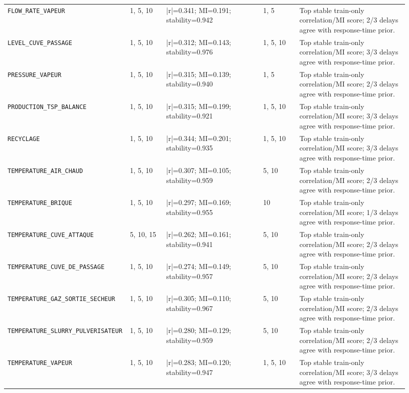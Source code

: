 \documentclass[10pt,a4paper]{article}
\begin{document}
\begin{landscape}
\begin{longtable}{p{0.24\linewidth}p{0.09\linewidth}p{0.24\linewidth}p{0.09\linewidth}p{0.27\linewidth}}
\nolinkurl{FLOW_RATE_VAPEUR} & 1, 5, 10 & |r|=0.341; MI=0.191; stability=0.942 & 1, 5 & Top stable train-only correlation/MI score; 2/3 delays agree with response-time prior. \\
\nolinkurl{LEVEL_CUVE_PASSAGE} & 1, 5, 10 & |r|=0.312; MI=0.143; stability=0.976 & 1, 5, 10 & Top stable train-only correlation/MI score; 3/3 delays agree with response-time prior. \\
\nolinkurl{PRESSURE_VAPEUR} & 1, 5, 10 & |r|=0.315; MI=0.139; stability=0.940 & 1, 5 & Top stable train-only correlation/MI score; 2/3 delays agree with response-time prior. \\
\nolinkurl{PRODUCTION_TSP_BALANCE} & 1, 5, 10 & |r|=0.315; MI=0.199; stability=0.921 & 1, 5, 10 & Top stable train-only correlation/MI score; 3/3 delays agree with response-time prior. \\
\nolinkurl{RECYCLAGE} & 1, 5, 10 & |r|=0.344; MI=0.201; stability=0.935 & 1, 5, 10 & Top stable train-only correlation/MI score; 3/3 delays agree with response-time prior. \\
\nolinkurl{TEMPERATURE_AIR_CHAUD} & 1, 5, 10 & |r|=0.307; MI=0.105; stability=0.959 & 5, 10 & Top stable train-only correlation/MI score; 2/3 delays agree with response-time prior. \\
\nolinkurl{TEMPERATURE_BRIQUE} & 1, 5, 10 & |r|=0.297; MI=0.169; stability=0.955 & 10 & Top stable train-only correlation/MI score; 1/3 delays agree with response-time prior. \\
\nolinkurl{TEMPERATURE_CUVE_ATTAQUE} & 5, 10, 15 & |r|=0.262; MI=0.161; stability=0.941 & 5, 10 & Top stable train-only correlation/MI score; 2/3 delays agree with response-time prior. \\
\nolinkurl{TEMPERATURE_CUVE_DE_PASSAGE} & 1, 5, 10 & |r|=0.274; MI=0.149; stability=0.957 & 5, 10 & Top stable train-only correlation/MI score; 2/3 delays agree with response-time prior. \\
\nolinkurl{TEMPERATURE_GAZ_SORTIE_SECHEUR} & 1, 5, 10 & |r|=0.305; MI=0.110; stability=0.967 & 5, 10 & Top stable train-only correlation/MI score; 2/3 delays agree with response-time prior. \\
\nolinkurl{TEMPERATURE_SLURRY_PULVERISATEUR} & 1, 5, 10 & |r|=0.280; MI=0.129; stability=0.959 & 5, 10 & Top stable train-only correlation/MI score; 2/3 delays agree with response-time prior. \\
\nolinkurl{TEMPERATURE_VAPEUR} & 1, 5, 10 & |r|=0.283; MI=0.120; stability=0.947 & 1, 5, 10 & Top stable train-only correlation/MI score; 3/3 delays agree with response-time prior. \\\bottomrule\end{longtable}\end{landscape}
\end{document}

